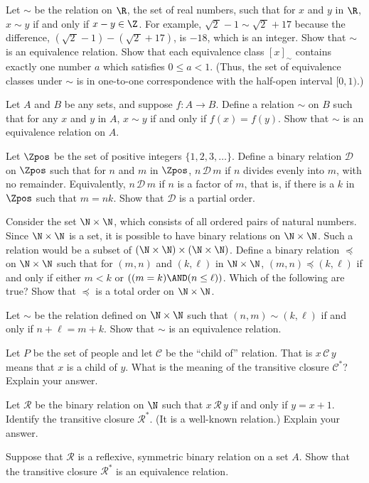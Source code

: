 \begin{exercises}
\problem Let $\sim$ be the relation on $\R$, the set of real numbers,
such that for $x$ and $y$ in $\R$, $x\sim y$ if and only if
$x-y\in\Z$.  For example, $\sqrt{2\,}-1\sim\sqrt{2\,}+17$
because the difference, $(\sqrt{2\,}-1)-(\sqrt{2\,}+17)$,
is $-${}$18$, which is an integer.  Show that $\sim$ is an equivalence
relation.  Show that each equivalence class $[x]_{\sim}$ contains
exactly one number $a$ which satisfies $0\le a<1$.  (Thus,
the set of equivalence classes under $\sim$ is in one-to-one
correspondence with the half-open interval $[0,1)$.)

\problem Let $A$ and $B$ be any sets, and suppose $f\colon A\to B$.
Define a relation $\sim$ on $B$ such that for any $x$ and $y$ in $A$,
$x\sim y$ if and only if $f(x)=f(y)$.  Show that $\sim$ is an
equivalence relation on $A$.

\problem Let $\Zpos$ be the set of positive integers $\{1,2,3,\dots\}$.
Define a binary relation $\mathscr D$ on $\Zpos$ such
that for $n$ and $m$ in $\Zpos$, $n\,{\mathscr D}\,m$ if
$n$ divides evenly into $m$, with no remainder.  Equivalently,
$n\,{\mathscr D}\,m$ if $n$ is a factor of $m$, that is, if
there is a $k$ in $\Zpos$ such that $m=nk$.  Show that $\mathscr D$
is a partial order.

\problem Consider the set $\N\times\N$, which consists of all
ordered pairs of natural numbers.  Since $\N\times\N$ is
a set, it is possible to have binary relations on $\N\times\N$.
Such a relation would be a subset of $(\N\times\N)\times(\N\times\N)$.
Define a binary relation $\preceq$ on $\N\times\N$ such that
for $(m,n)$ and $(k,\ell)$ in $\N\times\N$, $(m,n)\preceq(k,\ell)$
if and only if either $m<k$ or $((m=k)\AND (n\le\ell))$.  Which of the following
are true?
Show that $\preceq$ is a total order on $\N\times\N$.

\problem Let $\sim$ be the relation defined on $\N\times\N$
such that $(n,m)\sim(k,\ell)$ if and only if $n+\ell=m+k$.
Show that $\sim$ is an equivalence relation.

\problem Let $P$ be the set of people and let $\mathscr C$ be the
``child of'' relation.  That is $x\,{\mathscr C}\,y$ means that
$x$ is a child of $y$.  What is the meaning of the transitive
closure ${\mathscr C}^*$?  Explain your answer.

\problem Let $\mathscr R$ be the binary relation on $\N$ such that
$x\,{\mathscr R}\,y$ if and only if $y=x+1$.  Identify the
transitive closure ${\mathscr R}^*$.  (It is a well-known relation.)
Explain your answer.

\problem Suppose that $\mathscr R$ is a reflexive, symmetric
binary relation on a set $A$.  Show that the transitive closure
${\mathscr R}^*$ is an equivalence relation.

\end{exercises}


